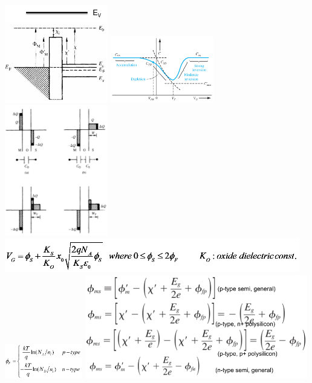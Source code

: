 \documentclass{article}
\begin{document}
\begin{center}
    \includegraphics[align=c, width=4.5cm]{mosflat.png}
    \includegraphics[align=c, width=4.5cm]{moscv.png}
    \includegraphics[align=c, width=4.5cm]{moscap.png}
    \includegraphics[align=c, height=1.5cm]{mosgatev.png}
    \includegraphics[align=c, height=1.5cm]{mosfermi.png}
    \includegraphics[align=c, height=4.5cm]{mosworkfuncs.png}
\end{center}
\end{document}
